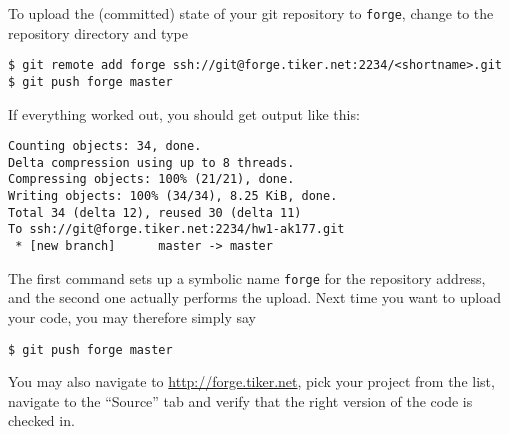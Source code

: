 \documentclass[11pt]{article}
\begin{document}
To upload the (committed) state of your git repository to
\texttt{forge}, change to the repository directory and type
\begin{lstlisting}
$ git remote add forge ssh://git@forge.tiker.net:2234/<shortname>.git
$ git push forge master
\end{lstlisting}
If everything worked out, you should get output like this:
\begin{lstlisting}
Counting objects: 34, done.
Delta compression using up to 8 threads.
Compressing objects: 100% (21/21), done.
Writing objects: 100% (34/34), 8.25 KiB, done.
Total 34 (delta 12), reused 30 (delta 11)
To ssh://git@forge.tiker.net:2234/hw1-ak177.git
 * [new branch]      master -> master
\end{lstlisting}
The first command sets up a symbolic name \texttt{forge} for the
repository address, and the second one actually performs the upload.
Next time you want to upload your code, you may therefore simply say
\begin{lstlisting}
$ git push forge master
\end{lstlisting}
You may also navigate to \url{http://forge.tiker.net}, pick your
project from the list, navigate to the ``Source'' tab and verify that
the right version of the code is checked in.
\end{document}
